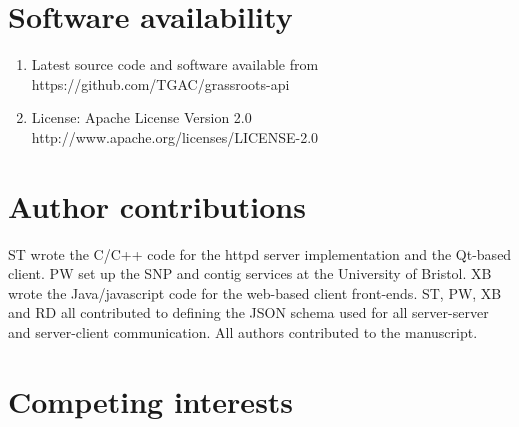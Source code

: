 \documentclass[9pt,a4paper]{extarticle}
\begin{document}
\section*{Software availability}

\begin{enumerate}
\item Latest source code and software available from https://github.com/TGAC/grassroots-api
\item License: Apache License Version 2.0 http://www.apache.org/licenses/LICENSE-2.0
\end{enumerate}

\section*{Author contributions}
ST wrote the C/C++ code for the httpd server implementation and the Qt-based client.
PW set up the SNP and contig services at the University of Bristol.
XB wrote the Java/javascript code for the web-based client front-ends.
ST, PW, XB and RD all contributed to defining the JSON schema used for all server-server and server-client communication.
All authors contributed to the manuscript.


\section*{Competing interests}
\end{document}
